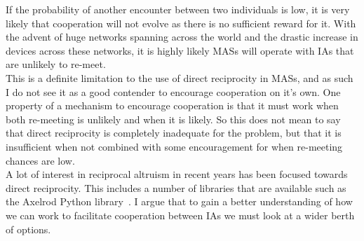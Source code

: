 \documentclass[]{final_report}
\begin{document}
If the probability of another encounter between two individuals is low, it is very likely that cooperation will not evolve as there is no sufficient reward for it. With the advent of huge networks spanning across the world and the drastic increase in devices across these networks, it is highly likely MASs will operate with IAs that are unlikely to re-meet.\\
This is a definite limitation to the use of direct reciprocity in MASs, and as such I do not see it as a good contender to encourage cooperation on it's own. One property of a mechanism to encourage cooperation is that it must work when both re-meeting is unlikely and when it is likely. So this does not mean to say that direct reciprocity is completely inadequate for the problem, but that it is insufficient when not combined with some encouragement for when re-meeting chances are low.\\
A lot of interest in reciprocal altruism in recent years has been focused towards direct reciprocity. This includes a number of libraries that are available such as the Axelrod Python library~\cite{axelrodproject}. I argue that to gain a better understanding of how we can work to facilitate cooperation between IAs we must look at a wider berth of options.
\end{document}
